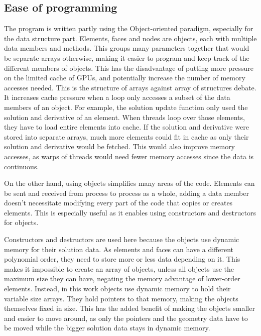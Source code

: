 \subsection{Ease of programming} \label{section:graphics_processing_units:data_structure:ease_of_programming}

The program is written partly using the Object-oriented paradigm, especially for the data structure
part. Elements, faces and nodes are objects, each with multiple data members and methods. This
groups many parameters together that would be separate arrays otherwise, making it easier to program
and keep track of the different members of objects. This has the disadvantage of putting more
pressure on the limited cache of GPUs, and potentially increase the number of memory accesses
needed. This is the structure of arrays against array of structures debate. It increases cache
pressure when a loop only accesses a subset of the data members of an object. For example, the
solution update function only used the solution and derivative of an element. When threads loop over
those elements, they have to load entire elements into cache. If the solution and derivative were
stored into separate arrays, much more elements could fit in cache as only their solution and
derivative would be fetched. This would also improve memory accesses, as warps of threads would need
fewer memory accesses since the data is continuous.

On the other hand, using objects simplifies many areas of the code. Elements can be sent and
received from process to process as a whole, adding a data member doesn't necessitate modifying
every part of the code that copies or creates elements. This is especially useful as it enables
using constructors and destructors for objects.


Constructors and destructors are used here because the objects use dynamic memory for their solution
data. As elements and faces can have a different polynomial order, they need to store more or less
data depending on it. This makes it impossible to create an array of objects, unless all objects use
the maximum size they can have, negating the memory advantage of lower-order elements. Instead, in
this work objects use dynamic memory to hold their variable size arrays. They hold pointers to that
memory, making the objects themselves fixed in size. This has the added benefit of making the
objects smaller and easier to move around, as only the pointers and the geometry data have to be
moved while the bigger solution data stays in dynamic memory. 

